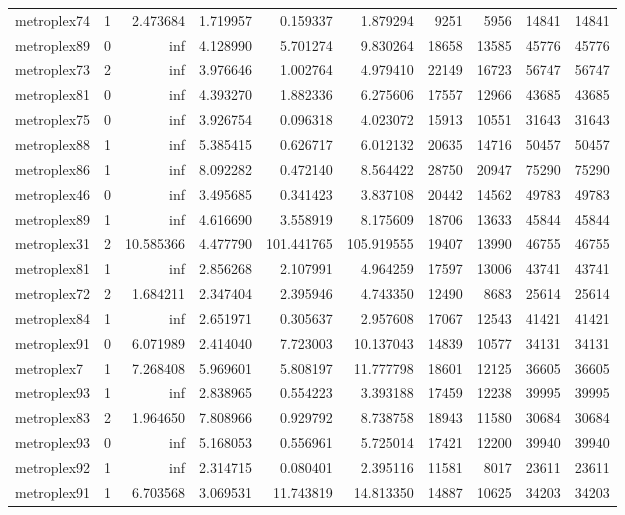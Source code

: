 \begin{longtable}{|l|r|r|r|r|r|r|r|r|r|}
metroplex74 & 1 & 2.473684 & 1.719957 & 0.159337 & 1.879294 & 9251 & 5956 & 14841 & 14841 \\
metroplex89 & 0 & inf & 4.128990 & 5.701274 & 9.830264 & 18658 & 13585 & 45776 & 45776 \\
metroplex73 & 2 & inf & 3.976646 & 1.002764 & 4.979410 & 22149 & 16723 & 56747 & 56747 \\
metroplex81 & 0 & inf & 4.393270 & 1.882336 & 6.275606 & 17557 & 12966 & 43685 & 43685 \\
metroplex75 & 0 & inf & 3.926754 & 0.096318 & 4.023072 & 15913 & 10551 & 31643 & 31643 \\
metroplex88 & 1 & inf & 5.385415 & 0.626717 & 6.012132 & 20635 & 14716 & 50457 & 50457 \\
metroplex86 & 1 & inf & 8.092282 & 0.472140 & 8.564422 & 28750 & 20947 & 75290 & 75290 \\
metroplex46 & 0 & inf & 3.495685 & 0.341423 & 3.837108 & 20442 & 14562 & 49783 & 49783 \\
metroplex89 & 1 & inf & 4.616690 & 3.558919 & 8.175609 & 18706 & 13633 & 45844 & 45844 \\
metroplex31 & 2 & 10.585366 & 4.477790 & 101.441765 & 105.919555 & 19407 & 13990 & 46755 & 46755 \\
metroplex81 & 1 & inf & 2.856268 & 2.107991 & 4.964259 & 17597 & 13006 & 43741 & 43741 \\
metroplex72 & 2 & 1.684211 & 2.347404 & 2.395946 & 4.743350 & 12490 & 8683 & 25614 & 25614 \\
metroplex84 & 1 & inf & 2.651971 & 0.305637 & 2.957608 & 17067 & 12543 & 41421 & 41421 \\
metroplex91 & 0 & 6.071989 & 2.414040 & 7.723003 & 10.137043 & 14839 & 10577 & 34131 & 34131 \\
metroplex7 & 1 & 7.268408 & 5.969601 & 5.808197 & 11.777798 & 18601 & 12125 & 36605 & 36605 \\
metroplex93 & 1 & inf & 2.838965 & 0.554223 & 3.393188 & 17459 & 12238 & 39995 & 39995 \\
metroplex83 & 2 & 1.964650 & 7.808966 & 0.929792 & 8.738758 & 18943 & 11580 & 30684 & 30684 \\
metroplex93 & 0 & inf & 5.168053 & 0.556961 & 5.725014 & 17421 & 12200 & 39940 & 39940 \\
metroplex92 & 1 & inf & 2.314715 & 0.080401 & 2.395116 & 11581 & 8017 & 23611 & 23611 \\
metroplex91 & 1 & 6.703568 & 3.069531 & 11.743819 & 14.813350 & 14887 & 10625 & 34203 & 34203 \\

\end{longtable}
